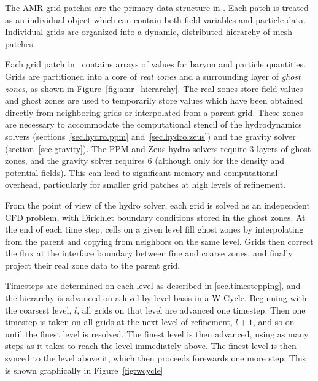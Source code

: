 The AMR grid patches are the primary data structure in \enzo.  Each patch is treated as an individual object which can contain both field variables and particle data.  Individual grids are organized into a  dynamic, distributed hierarchy of mesh patches.  

Each grid patch in \enzo\ contains arrays of values for baryon and particle quantities.   Grids are partitioned into a core of \emph{real zones} and a surrounding layer of \emph{ghost zones}, as shown in Figure~\ref{fig:amr_hierarchy}.  The real zones store field values and ghost zones are used to temporarily store values which have been obtained directly from neighboring grids or interpolated from a parent grid.  These zones are necessary to accommodate the computational stencil of the hydrodynamics solvers (sections~\ref{sec.hydro.ppm} and~\ref{sec.hydro.zeus}) and the gravity solver (section~\ref{sec.gravity}).  The PPM and Zeus hydro solvers require 3 layers of ghost zones,  and the gravity solver requires 6 (although only for the density and potential fields).  This can lead to significant memory and computational overhead, particularly for smaller grid patches at high levels of refinement.  

From the point of view of the hydro solver, each grid is solved as an independent CFD problem, with Dirichlet boundary conditions stored in the ghost zones.  At the end of each time step, cells on a given level fill ghost zones by interpolating from the parent and copying from neighbors on the same level.  Grids then correct the flux at the interface boundary between fine and coarse zones, and finally project their real zone data to the parent grid. 

Timesteps are determined on each level as described in \ref{sec.timestepping}, and the hierarchy is advanced on
a level-by-level basis in a W-Cycle.    Beginning with the coarsest level, $l$, all grids on that level are advanced one
timestep.  Then one timestep is taken on all grids at the next level of refinement, $l+1$, and so on until the finest level is resolved. The finest level is then advanced, using as many steps as it takes to reach the level immediately above.  The finest level is then synced to the level above it, which then proceeds forewards one more step.  This is shown graphically in Figure~\ref{fig:wcycle}

